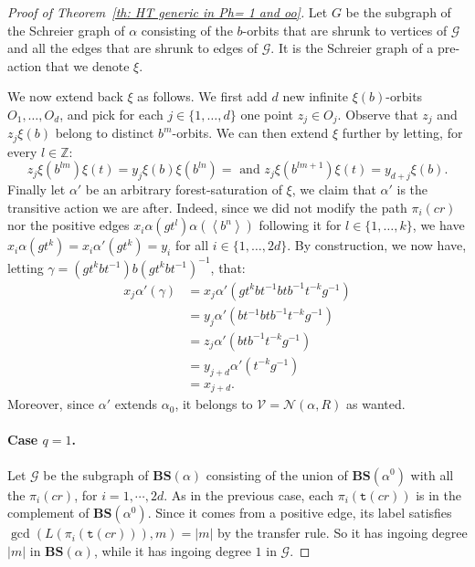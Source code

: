 \documentclass[12pt]{article}
\numberwithin{equation}{section}
\theoremstyle{definition}
\newcommand{\Z}{\mathbb{Z}}
\newcommand{\inv}{^{-1}}
\newcommand{\la}{\left\langle}
\newcommand{\ra}{\right\rangle}
\newcommand{\abs}[1]{\left\lvert #1\right\rvert}
\newcommand\BSe{\mathbf{BS}}
\newcommand{\target}{\mathtt{t}}
\begin{document}
\begin{proof}[Proof of Theorem~\ref{th: HT generic in Ph= 1 and oo}]
    Let $G$ be the subgraph of the Schreier graph of \( \alpha \) consisting of the 
	\( b \)-orbits that are shrunk to vertices of $\mathcal G$ 
    and all the edges that are shrunk to edges of $\mathcal{G}$. 
    It is the Schreier graph of a pre-action that we denote \( \xi \). 
	
	We now extend back \(\xi\) as follows.
	We first add \(d\) new infinite \(\xi(b)\)-orbits \(O_1,\dots,O_d\), and pick for each \(j\in\{1,\dots,d\}\)
	one point \(z_j\in O_j\). Observe that \(z_j\) and \(z_j\xi(b)\) belong to distinct \(b^m\)-orbits.
	We can then extend \(\xi\) further by letting, for every \(l\in\Z\): 
	\[
	z_j \xi(b^{lm})\xi(t)=y_j\xi(b) \xi(b^{ln}) =\text{ and } 
	z_j \xi(b^{lm+1})\xi(t)=y_{d+j} \xi(b).
	\]
	Finally let \(\alpha'\) be an arbitrary forest-saturation of \(\xi\), 
	we claim that $\alpha'$ 
    is the transitive action we are after.
    Indeed, since we did not modify the path $\pi_i(cr)$ nor
	the positive edges \(x_i\alpha(gt^l)\alpha(\la b^n\ra)\) following it for 
	\(l\in\{1,\dots,k\}\), 
	we have $x_i\alpha(gt^k) = x_i\alpha'(gt^k) = y_i$ 
	for all $i\in\{1,\dots,2d\}$.
    By construction, we now have, letting \(\gamma=(gt^kbt\inv)b(gt^kbt\inv)^{-1}\), that:
    \begin{align*}
		x_j\alpha'(\gamma)&=x_j\alpha'(gt^k bt^{-1}btb\inv t ^{-k}g^{-1})\\
         & = y_j\alpha'(bt^{-1}btb^{-1}t^{-k}g^{-1})\\
        & = z_j\alpha'(btb^{-1}t^{-k}g^{-1})\\
        & = y_{j+d}\alpha'(t^{-k}g\inv)\\
        & = x_{j+d}.
    \end{align*}
    Moreover, since $\alpha'$ extends \( \alpha_0 \), 
	it belongs to \( \mathcal V=\mathcal N(\alpha,R) \) as wanted. 

	
	\paragraph{Case $q=1$.}
    Let $\mathcal G$ be the subgraph of \( \BSe(\alpha) \)  consisting of the union of $\BSe(\alpha^0)$ with all the $\pi_i(cr)$, for $i=1, \cdots, 2d$.
   	As in the previous case, each $\pi_i(\target(cr))$ is in the complement of $\BSe(\alpha^0)$. Since it comes from a positive edge, its label satisfies $\gcd(L(\pi_i(\target(cr))),m)=\abs{m}$ by the transfer rule. 
   	So it has ingoing degree $\abs{m}$ in \( \BSe(\alpha) \), 
    while it has ingoing degree $1$ in $\mathcal G$.
	

\end{proof}
\end{document}
